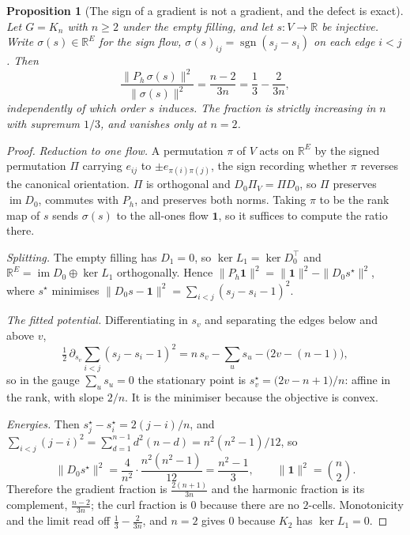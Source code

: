 \documentclass[11pt,a4paper]{article}
\newtheorem{proposition}{Proposition}
\theoremstyle{definition}
\theoremstyle{remark}
\newcommand{\R}{\mathbb{R}}
\newcommand{\im}{\operatorname{im}}
\newcommand{\Ph}{P_h}
\begin{document}
\begin{proposition}[The sign of a gradient is not a gradient, and the defect is exact]\label{prop:signdefect}\label{prop:sign}
Let $G=K_n$ with $n\ge2$ under the empty filling, and let $s:V\to\R$ be injective. Write $\sigma(s)\in\R^E$ for the sign flow, $\sigma(s)_{ij}=\operatorname{sgn}(s_j-s_i)$ on each edge $i<j$. Then
\[
\frac{\|\Ph\,\sigma(s)\|^2}{\|\sigma(s)\|^2}=\frac{n-2}{3n}
=\frac13-\frac{2}{3n},
\]
independently of which order $s$ induces. The fraction is strictly increasing in $n$ with supremum $1/3$, and vanishes only at $n=2$.
\end{proposition}

\begin{proof}
\emph{Reduction to one flow.} A permutation $\pi$ of $V$ acts on $\R^E$ by the signed permutation $\Pi$ carrying $e_{ij}$ to $\pm e_{\pi(i)\pi(j)}$, the sign recording whether $\pi$ reverses the canonical orientation. $\Pi$ is orthogonal and $D_0\Pi_V=\Pi D_0$, so $\Pi$ preserves $\im D_0$, commutes with $\Ph$, and preserves both norms. Taking $\pi$ to be the rank map of $s$ sends $\sigma(s)$ to the all-ones flow $\mathbf 1$, so it suffices to compute the ratio there.

\emph{Splitting.} The empty filling has $D_1=0$, so $\ker L_1=\ker D_0^{\top}$ and $\R^E=\im D_0\oplus\ker L_1$ orthogonally. Hence $\|\Ph\mathbf 1\|^2=\|\mathbf 1\|^2-\|D_0s^\star\|^2$, where $s^\star$ minimises $\|D_0s-\mathbf 1\|^2=\sum_{i<j}(s_j-s_i-1)^2$.

\emph{The fitted potential.} Differentiating in $s_v$ and separating the edges below and above $v$,
\[
\tfrac12\,\partial_{s_v}\textstyle\sum_{i<j}(s_j-s_i-1)^2
= n\,s_v-\textstyle\sum_u s_u-\bigl(2v-(n-1)\bigr),
\]
so in the gauge $\sum_u s_u=0$ the stationary point is $s^\star_v=\bigl(2v-n+1\bigr)/n$: affine in the rank, with slope $2/n$. It is the minimiser because the objective is convex.

\emph{Energies.} Then $s^\star_j-s^\star_i=2(j-i)/n$, and $\sum_{i<j}(j-i)^2=\sum_{d=1}^{n-1}d^2(n-d)=n^2(n^2-1)/12$, so
\[
\|D_0s^\star\|^2=\frac{4}{n^2}\cdot\frac{n^2(n^2-1)}{12}=\frac{n^2-1}{3},
\qquad
\|\mathbf 1\|^2=\binom n2 .
\]
Therefore the gradient fraction is $\tfrac{2(n+1)}{3n}$ and the harmonic fraction is its complement, $\tfrac{n-2}{3n}$; the curl fraction is $0$ because there are no $2$-cells. Monotonicity and the limit read off $\tfrac13-\tfrac2{3n}$, and $n=2$ gives $0$ because $K_2$ has $\ker L_1=0$.
\end{proof}
\end{document}
